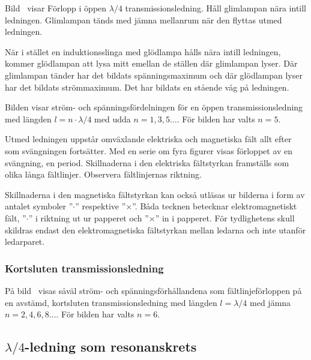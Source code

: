 
Bild~ visar Förlopp i öppen $\lambda/4$
transmissionsledning.
Håll glimlampan nära intill ledningen.
Glimlampan tänds med jämna mellanrum när den flyttas utmed ledningen.

När i stället en induktionsslinga med glödlampa hålls nära intill ledningen,
kommer glödlampan att lysa mitt emellan de ställen där glimlampan lyser.
Där glimlampan tänder har det bildats spänningsmaximum och där glödlampan lyser
har det bildats strömmaximum.
Det har bildats en stående våg på ledningen.

Bilden visar ström- och spänningsfördelningen för en öppen transmissionsledning
med längden \(l = n\cdot\lambda/4\) med udda \(n = 1, 3, 5 \dots\).
För bilden har valts $n = 5$.

Utmed ledningen uppstår omväxlande elektriska och magnetiska fält allt
efter som svängningen fortsätter.
Med en serie om fyra figurer visas förloppet av en svängning, en period.
Skillnaderna i den elektriska fältstyrkan framställs som olika långa fältlinjer.
Observera fältlinjernas riktning.

Skillnaderna i den magnetiska fältstyrkan kan också utläsas ur
bilderna i form av antalet symboler ''\(\cdot\)'' respektive ''\(\times\)''.
Båda tecknen betecknar elektromagnetiskt fält, ''\(\cdot\)'' i riktning ut ur
papperet och ''\(\times\)'' in i papperet.
För tydlighetens skull skildras endast den elektromagnetiska fältstyrkan
mellan ledarna och inte utanför ledarparet.

\subsubsection{Kortsluten transmissionsledning}


På bild~ visas såväl ström- och spänningsförhållandena
som fältlinjeförloppen på en avstämd, kortsluten transmissionsledning med
längden \(l = \lambda/4\) med jämna \(n = 2, 4, 6, 8 \dots\).
För bilden har valts \(n = 6\).

\subsection{$\lambda/4$-ledning som resonanskrets}


